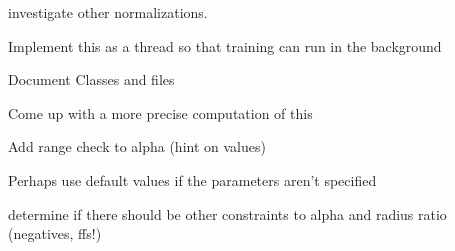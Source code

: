 \begin{DoxyRefList}
investigate other normalizations.  
\item[\label{todo__todo000013}%
\hypertarget{todo__todo000013}{}%
\-Class \hyperlink{classsomtk_1_1_h_s_o_m}{somtk\-:\-:\-H\-S\-O\-M} ]\-Implement this as a thread so that training can run in the background  
\item[\label{todo__todo000014}%
\hypertarget{todo__todo000014}{}%
\-Class \hyperlink{classsomtk_1_1_normalizer}{somtk\-:\-:\-Normalizer} ]\-Document \-Classes and files  
\item[\label{todo__todo000009}%
\hypertarget{todo__todo000009}{}%
\-Member \hyperlink{classsomtk_1_1_quad_grid_a66fcbc5e3536f024af8989f576b653c1}{somtk\-:\-:\-Quad\-Grid$<$ \-T $>$\-:\-:diagonal} ()]\-Come up with a more precise computation of this  
\item[\label{todo__todo000015}%
\hypertarget{todo__todo000015}{}%
\-Member \hyperlink{classsomtk_1_1_s_o_m_aadfc8959f890dae25ae4ffcb3006b307}{somtk\-:\-:\-S\-O\-M\-:\-:initialize\-Training} (\-Q\-Map$<$ Q\-String, Q\-Variant $>$ som\-Parameters, \-Normalizer\-Ptr normalizer, int feature\-Size)]\-Add range check to alpha (hint on values) 

\-Perhaps use default values if the parameters aren't specified 

determine if there should be other constraints to alpha and radius ratio (negatives, ffs!) 
\end{DoxyRefList}